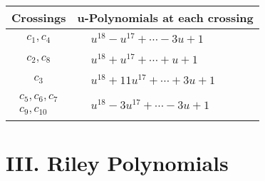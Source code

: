 \documentclass[1p]{elsarticle_modified}
\theoremstyle{definition}
\begin{document}
\begin{tabular}{m{50pt}|m{274pt}}
Crossings & \hspace{64pt}u-Polynomials at each crossing \\
\hline $$\begin{aligned}c_{1},c_{4}\end{aligned}$$&$\begin{aligned}
&u^{18}- u^{17}+\cdots-3 u+1
\end{aligned}$\\
\hline $$\begin{aligned}c_{2},c_{8}\end{aligned}$$&$\begin{aligned}
&u^{18}+u^{17}+\cdots+u+1
\end{aligned}$\\
\hline $$\begin{aligned}c_{3}\end{aligned}$$&$\begin{aligned}
&u^{18}+11 u^{17}+\cdots+3 u+1
\end{aligned}$\\
\hline $$\begin{aligned}c_{5},c_{6},c_{7}\\c_{9},c_{10}\end{aligned}$$&$\begin{aligned}
&u^{18}-3 u^{17}+\cdots-3 u+1
\end{aligned}$\\
\hline
\end{tabular}\newpage\renewcommand{\arraystretch}{1}
\centering \section*{ III. Riley Polynomials}
\end{document}
